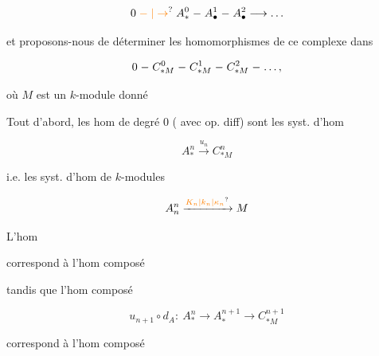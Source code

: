 \[
0\mathrel{\unsure{\relbar|\to}} A_*^0\relbar A_\bullet^1\relbar A_\bullet^2\longrightarrow\ldots
\]

et proposons-nous de déterminer les homomorphismes de ce complexe dans

\[
0\relbar C^0_{*M}\relbar C^1_{*M}\relbar C^2_{*M}\relbar\ldots,
\]

où $M$ est un $k$-module donné

Tout d'abord, les hom de degré $0$ (   avec op. diff) sont les syst. d'hom

\[
A_*^n\xrightarrow{u_n}C^n_{*M}
\]

i.e. les syst. d'hom de $k$-modules

\[
A_n^n\xrightarrow{\unsure{K_n|k_n|\kappa_n}}M
\]

 L'hom 


correspond à  l'hom composé


tandis que l'hom composé

\[
u_{n+1}\circ d_A\mathpunct{:}\ A^n_*\longrightarrow A^{n+1}_*\longrightarrow C^{n+1}_{*M}
\]

correspond à l'hom composé


